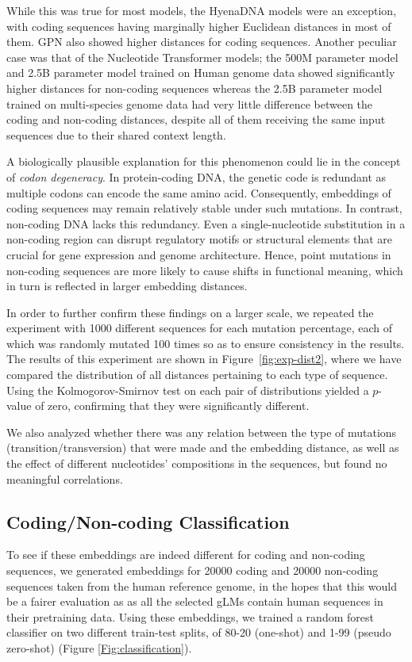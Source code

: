 \documentclass{ifacconf}
\begin{document}
While this was true for most models, the HyenaDNA models were an exception, with coding sequences having marginally higher Euclidean distances in most of them. GPN also showed higher distances for coding sequences. Another peculiar case was that of the Nucleotide Transformer models; the 500M parameter model and 2.5B parameter model trained on Human genome data showed significantly higher distances for non-coding sequences whereas the 2.5B parameter model trained on multi-species genome data had very little difference between the coding and non-coding distances, despite all of them receiving the same input sequences due to their shared context length. 

A biologically plausible explanation for this phenomenon could lie in the concept of \emph{codon degeneracy}. In protein-coding DNA, the genetic code is redundant as multiple codons can encode the same amino acid. Consequently, embeddings of coding sequences may remain relatively stable under such mutations. In contrast, non-coding DNA lacks this redundancy. Even a single-nucleotide substitution in a non-coding region can disrupt regulatory motifs or structural elements that are crucial for gene expression and genome architecture. Hence, point mutations in non-coding sequences are more likely to cause shifts in functional meaning, which in turn is reflected in larger embedding distances.

In order to further confirm these findings on a larger scale, we repeated the experiment with 1000 different sequences for each mutation percentage, each of which was randomly mutated 100 times so as to ensure consistency in the results. The results of this experiment are shown in Figure~\ref{fig:exp-dist2}, where we have compared the distribution of all distances pertaining to each type of sequence. Using the Kolmogorov-Smirnov test on each pair of distributions yielded a $p$-value of zero, confirming that they were significantly different.

We also analyzed whether there was any relation between the type of mutations (transition/transversion) that were made and the embedding distance, as well as the effect of different nucleotides' compositions in the sequences, but found no meaningful correlations.

\subsection{Coding/Non-coding Classification}
To see if these embeddings are indeed different for coding and non-coding sequences, we generated embeddings for 20000 coding and 20000 non-coding sequences taken from the human reference genome, in the hopes that this would be a fairer evaluation as as all the selected gLMs contain human sequences in their pretraining data. Using these embeddings, we trained a random forest classifier on two different train-test splits, of 80-20 (one-shot)  and 1-99 (pseudo zero-shot) (Figure \ref{Fig:classification}). 
\end{document}
